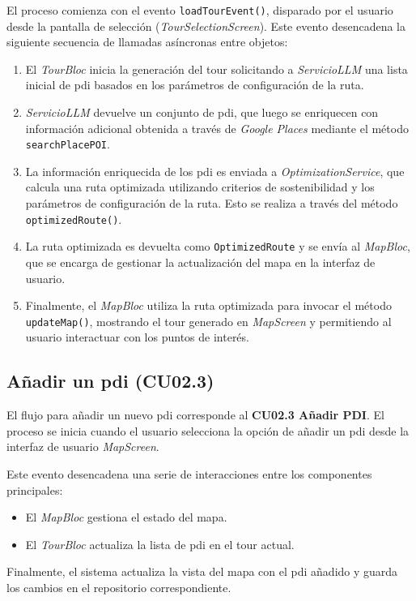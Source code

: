 El proceso comienza con el evento \texttt{loadTourEvent()}, disparado por el usuario desde la pantalla de selección (\textit{TourSelectionScreen}). Este evento desencadena la siguiente secuencia de llamadas asíncronas entre objetos:
\begin{enumerate}
	\item El \textit{TourBloc} inicia la generación del tour solicitando a \textit{ServicioLLM} una lista inicial de \acrlong{pdi} basados en los parámetros de configuración de la ruta.
	\item \textit{ServicioLLM} devuelve un conjunto de \acrlong{pdi}, que luego se enriquecen con información adicional obtenida a través de \textit{Google Places} mediante el método \texttt{searchPlacePOI}.
	\item La información enriquecida de los \acrlong{pdi} es enviada a \textit{OptimizationService}, que calcula una ruta optimizada utilizando criterios de sostenibilidad y los parámetros de configuración de la ruta. Esto se realiza a través del método \texttt{optimizedRoute()}.
	\item La ruta optimizada es devuelta como \texttt{OptimizedRoute} y se envía al \textit{MapBloc}, que se encarga de gestionar la actualización del mapa en la interfaz de usuario.
	\item Finalmente, el \textit{MapBloc} utiliza la ruta optimizada para invocar el método \texttt{updateMap()}, mostrando el tour generado en \textit{MapScreen} y permitiendo al usuario interactuar con los puntos de interés.
\end{enumerate}

\subsection{Añadir un \acrfull{pdi} (CU02.3)}
El flujo para añadir un nuevo \acrshort{pdi} corresponde al \textbf{CU02.3 Añadir PDI}. El proceso se inicia cuando el usuario selecciona la opción de añadir un \acrshort{pdi} desde la interfaz de usuario \textit{MapScreen}. 

Este evento desencadena una serie de interacciones entre los componentes principales:
\begin{itemize}
	\item El \textit{MapBloc} gestiona el estado del mapa.
	\item El \textit{TourBloc} actualiza la lista de \acrshort{pdi} en el tour actual.
\end{itemize}
Finalmente, el sistema actualiza la vista del mapa con el \acrshort{pdi} añadido y guarda los cambios en el repositorio correspondiente.

